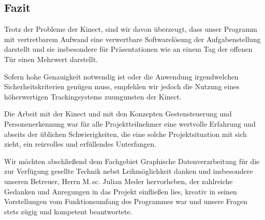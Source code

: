 \subsection{Fazit}
Trotz der Probleme der Kinect, sind wir davon überzeugt, dass unser Programm mit vertretbarem Aufwand eine verwertbare Softwarelösung der Aufgabenstellung darstellt und sie insbesondere für Präsentationen wie an einem Tag der offenen Tür einen Mehrwert darstellt.\par 
Sofern hohe Genauigkeit notwendig ist oder die Anwendung irgendwelchen Sicherheitskriterien genügen muss, empfehlen wir jedoch die Nutzung eines höherwertigen Trackingsystems zuungunsten der Kinect.\par 
Die Arbeit mit der Kinect und mit den Konzepten Gestensteuerung und Personenerkennung war für alle Projektteilnehmer eine wertvolle Erfahrung und abseits der üblichen Schwierigkeiten, die eine solche Projektsituation mit sich zieht, ein reizvolles und erfüllendes Unterfangen.\par\bigskip
Wir möchten abschließend dem Fachgebiet Graphische Datenverarbeitung für die zur Verfügung gesellte Technik nebst Leihmöglichkeit danken und insbesondere unseren Betreuer, Herrn M.\,sc. Julian Meder hervorheben, der zahlreiche Gedanken und Anregungen in das Projekt einfließen lies, kreativ in seinen Vorstellungen vom Funktionsumfang des Programmes war und unsere Fragen stets zügig und kompetent beantwortete.
